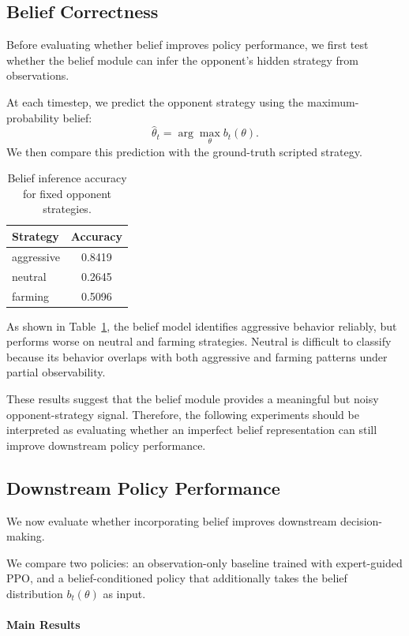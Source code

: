 \documentclass{article}
\begin{document}
\subsection{Belief Correctness}

Before evaluating whether belief improves policy performance, we first test whether the belief module can infer the opponent's hidden strategy from observations.

At each timestep, we predict the opponent strategy using the maximum-probability belief:
\[
\hat{\theta}_t = \arg\max_{\theta} b_t(\theta).
\]
We then compare this prediction with the ground-truth scripted strategy.

\begin{table}[h]
\centering
\begin{tabular}{lc}
\hline
Strategy & Accuracy \\
\hline
aggressive & 0.8419 \\
neutral & 0.2645 \\
farming & 0.5096 \\
\hline
\end{tabular}
\caption{Belief inference accuracy for fixed opponent strategies.}
\label{tab:belief_accuracy}
\end{table}

As shown in Table~\ref{tab:belief_accuracy}, the belief model identifies aggressive behavior reliably, but performs worse on neutral and farming strategies. 
Neutral is difficult to classify because its behavior overlaps with both aggressive and farming patterns under partial observability.

These results suggest that the belief module provides a meaningful but noisy opponent-strategy signal. 
Therefore, the following experiments should be interpreted as evaluating whether an imperfect belief representation can still improve downstream policy performance.


\subsection{Downstream Policy Performance}

We now evaluate whether incorporating belief improves downstream decision-making.

We compare two policies: an observation-only baseline trained with expert-guided PPO, and a belief-conditioned policy that additionally takes the belief distribution $b_t(\theta)$ as input.

\paragraph{Main Results}
\end{document}
